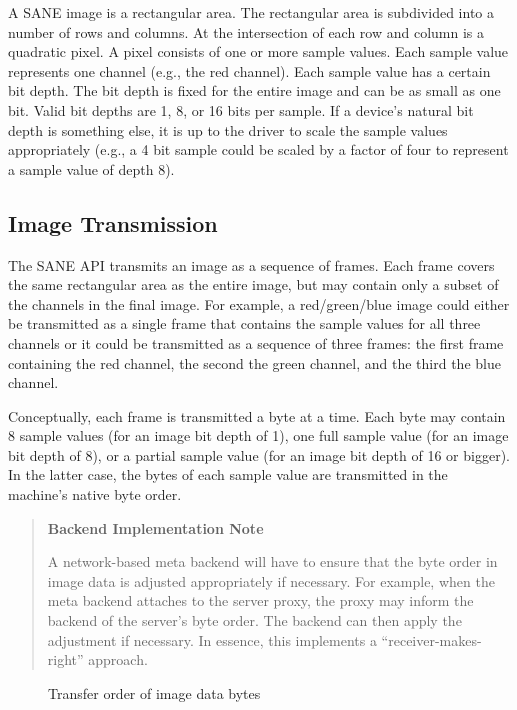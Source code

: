 \documentclass[11pt,DVIps]{report}
\begin{document}
A SANE image is a rectangular area.  The rectangular area is
subdivided into a number of rows and columns.  At the intersection of
each row and column is a quadratic pixel.  A pixel consists of one or
more sample values.  Each sample value represents one channel (e.g.,
the red channel).  Each sample value has a certain bit depth.  The bit
depth is fixed for the entire image and can be as small as one bit.
Valid bit depths are 1, 8, or 16 bits per sample.  If a device's
natural bit depth is something else, it is up to the driver to scale
the sample values appropriately (e.g., a 4 bit sample could be scaled
by a factor of four to represent a sample value of depth 8).

\subsection{Image Transmission}

The SANE API transmits an image as a sequence of frames.  Each frame
covers the same rectangular area as the entire image, but may contain
only a subset of the channels in the final image.  For example, a
red/green/blue image could either be transmitted as a single frame
that contains the sample values for all three channels or it could be
transmitted as a sequence of three frames: the first frame containing
the red channel, the second the green channel, and the third the blue
channel.

Conceptually, each frame is transmitted a byte at a time.  Each byte
may contain 8 sample values (for an image bit depth of 1), one full
sample value (for an image bit depth of 8), or a partial sample value
(for an image bit depth of 16 or bigger).  In the latter case, the
bytes of each sample value are transmitted in the machine's native
byte order.
\begin{quote}
  \begin{center}
    {\bf Backend Implementation Note}
  \end{center}
  A network-based meta backend will have to ensure that the byte order
  in image data is adjusted appropriately if necessary.  For example,
  when the meta backend attaches to the server proxy, the proxy may
  inform the backend of the server's byte order.  The backend can then
  apply the adjustment if necessary.  In essence, this implements a
  ``receiver-makes-right'' approach.
\end{quote}

\begin{figure}[htbp]
  \begin{center}
    \leavevmode
    \caption{Transfer order of image data bytes}
    \label{fig:xfer}
  \end{center}
\end{figure}
\end{document}

